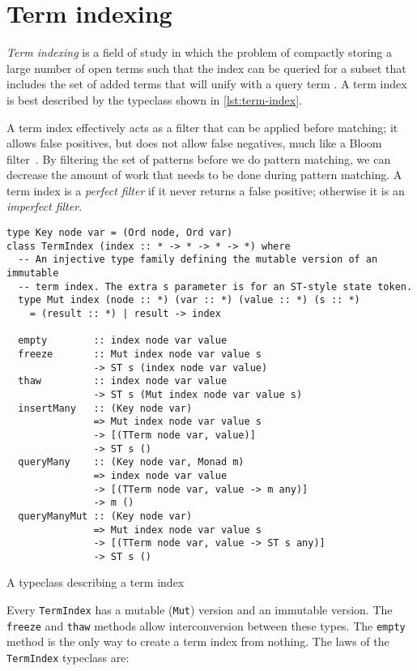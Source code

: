 \documentclass[11pt]{report}
\newcommand{\haskell}[1]{\texttt{#1}}
\begin{document}
\section{Term indexing}
\label{sec:term-indexing}

\textit{Term indexing} is a field of study in which the problem of compactly
storing a large number of open terms such that the index can be queried for a
subset that includes the set of added terms that will unify with a query term
\cite{handbook-ch26}. A term index is best described by the typeclass shown in
\autoref{lst:term-index}.

A term index effectively acts as a filter that can be applied before matching;
it allows false positives, but does not allow false negatives, much like a
Bloom filter~\cite{bloom-1970}. By filtering the set of patterns before we do
pattern matching, we can decrease the amount of work that needs to be done
during pattern matching. A term index is a \textit{perfect filter} if it never
returns a false positive; otherwise it is an \textit{imperfect filter}.

\begin{listing}[ht]
\begin{verbatim}
type Key node var = (Ord node, Ord var)
class TermIndex (index :: * -> * -> * -> *) where
  -- An injective type family defining the mutable version of an immutable
  -- term index. The extra s parameter is for an ST-style state token.
  type Mut index (node :: *) (var :: *) (value :: *) (s :: *)
    = (result :: *) | result -> index

  empty        :: index node var value
  freeze       :: Mut index node var value s
               -> ST s (index node var value)
  thaw         :: index node var value
               -> ST s (Mut index node var value s)
  insertMany   :: (Key node var)
               => Mut index node var value s
               -> [(TTerm node var, value)]
               -> ST s ()
  queryMany    :: (Key node var, Monad m)
               => index node var value
               -> [(TTerm node var, value -> m any)]
               -> m ()
  queryManyMut :: (Key node var)
               => Mut index node var value s
               -> [(TTerm node var, value -> ST s any)]
               -> ST s ()
\end{verbatim}
\caption{A typeclass describing a term index}
\label{lst:term-index}
\end{listing}

Every \haskell{TermIndex} has a mutable (\haskell{Mut}) version and an immutable
version. The \haskell{freeze} and \haskell{thaw} methods allow interconversion
between these types. The \haskell{empty} method is the only way to create a term
index from nothing. The laws of the \haskell{TermIndex} typeclass are:
\end{document}
